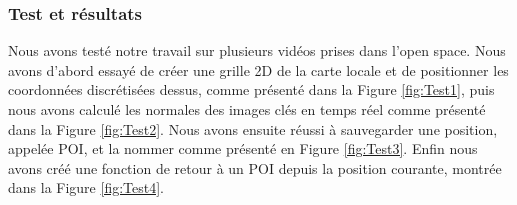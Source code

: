 \documentclass[11pt]{article}
\begin{document}
      \subsubsection{Test et résultats}
        Nous avons testé notre travail sur plusieurs vidéos prises dans l'open space. Nous avons d'abord essayé de créer une grille 2D de la 
        carte locale et de positionner les coordonnées discrétisées dessus, comme présenté dans la Figure \ref{fig:Test1}, 
        puis nous avons calculé les normales des images clés en temps réel 
        comme présenté dans la Figure \ref{fig:Test2}. Nous avons ensuite réussi à sauvegarder une position, appelée POI, et la nommer comme
        présenté en Figure \ref{fig:Test3}. Enfin nous avons créé une fonction de retour à un POI depuis la position courante, montrée dans la 
        Figure \ref{fig:Test4}.
\end{document}
